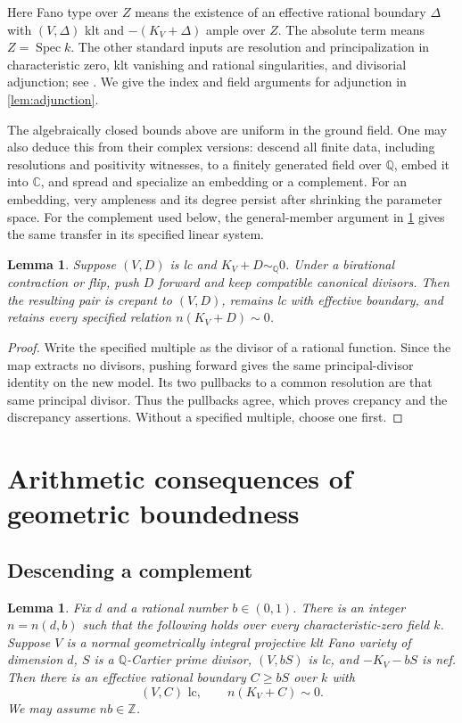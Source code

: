 \documentclass[11pt]{article}
\numberwithin{equation}{section}
\newtheorem{lemma}[theorem]{Lemma}
\theoremstyle{definition}
\newcommand{\Q}{\mathbb Q}
\newcommand{\Z}{\mathbb Z}
\newcommand{\Spec}{\operatorname{Spec}}
\newcommand{\simq}{\sim_{\Q}}
\begin{document}
Here Fano type over $Z$ means the existence of an effective rational
boundary $\Delta$ with $(V,\Delta)$ klt and $-(K_V+\Delta)$ ample over
$Z$. The absolute term means $Z=\Spec k$. The other standard inputs are
resolution and principalization in characteristic zero, klt vanishing
and rational singularities, and divisorial adjunction; see
\cite{BMT2011,KM1998,Kollar2013}. We give the index and field arguments
for adjunction in \cref{lem:adjunction}.

The algebraically closed bounds above are uniform in the ground field.
One may also deduce this from their complex versions: descend all finite
data, including resolutions and positivity witnesses, to a finitely
generated field over $\Q$, embed it into $\mathbb C$, and spread and
specialize an embedding or a complement. For an embedding, very ampleness
and its degree persist after shrinking the parameter space. For the
complement used below, the general-member argument in
\cref{lem:complement} gives the same transfer in its specified linear
system.

\begin{lemma}\label{lem:crepant}
Suppose $(V,D)$ is lc and $K_V+D\simq0$. Under a birational contraction
or flip, push $D$ forward and keep compatible canonical divisors. Then
the resulting pair is crepant to $(V,D)$, remains lc with effective
boundary, and retains every specified relation $n(K_V+D)\sim0$.
\end{lemma}

\begin{proof}
Write the specified multiple as the divisor of a rational function.
Since the map extracts no divisors, pushing forward gives the same
principal-divisor identity on the new model. Its two pullbacks to a
common resolution are that same principal divisor. Thus the pullbacks
agree, which proves crepancy and the discrepancy assertions. Without a
specified multiple, choose one first.
\end{proof}

\section{Arithmetic consequences of geometric boundedness}\label{sec:arithmetic}

\subsection{Descending a complement}

\begin{lemma}\label{lem:complement}
Fix $d$ and a rational number $b\in(0,1)$. There is an integer $n=n(d,b)$
such that the following holds over every characteristic-zero field $k$.
Suppose $V$ is a normal geometrically integral projective klt Fano
variety of dimension $d$, $S$ is a $\Q$-Cartier prime divisor,
$(V,bS)$ is lc, and $-K_V-bS$ is nef. Then there is an effective rational
boundary $C\geq bS$ over $k$ with
\[
 (V,C)\text{ lc},\qquad n(K_V+C)\sim0.
\]
We may assume $nb\in\Z$.
\end{lemma}
\end{document}

